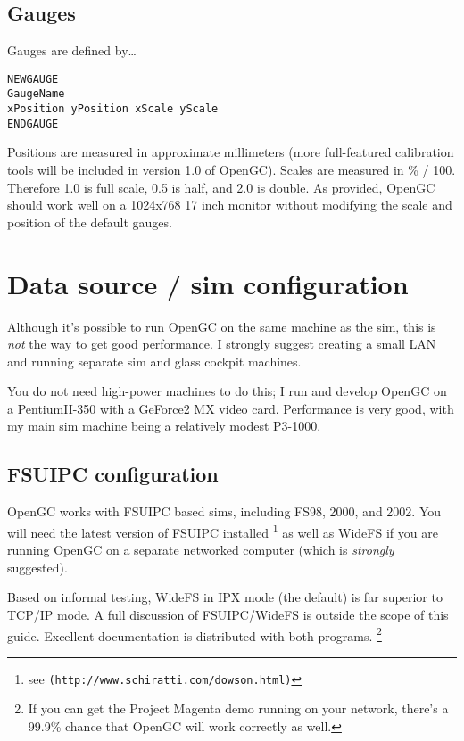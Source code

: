\documentclass[11pt]{article}
\begin{document}
\subsection{Gauges}

Gauges are defined by\dots

\begin{verbatim}
NEWGAUGE
GaugeName
xPosition yPosition xScale yScale
ENDGAUGE
\end{verbatim}

Positions are measured in approximate millimeters (more full-featured calibration tools will be included in version 1.0 of OpenGC). Scales are measured in \% / 100. Therefore 1.0 is full scale, 0.5 is half, and 2.0 is double. As provided, OpenGC should work well on a 1024x768 17 inch monitor without modifying the scale and position of the default gauges.

\section{Data source / sim configuration}

Although it's possible to run OpenGC on the same machine as the sim, this is \emph{not} the way to get good performance. I strongly suggest creating a small LAN and running separate sim and glass cockpit machines.

You do not need high-power machines to do this; I run and develop OpenGC on a PentiumII-350 with a GeForce2 MX video card. Performance is very good, with my main sim machine being a relatively modest P3-1000.

\subsection{FSUIPC configuration}

OpenGC works with FSUIPC based sims, including FS98, 2000, and 2002. You will need the latest version of FSUIPC installed \footnote{see \texttt{(http://www.schiratti.com/dowson.html)}} as well as WideFS if you are running OpenGC on a separate networked computer (which is \emph{strongly} suggested).

Based on informal testing, WideFS in IPX mode (the default) is far superior to TCP/IP mode. A full discussion of FSUIPC/WideFS is outside the scope of this guide. Excellent documentation is distributed with both programs. \footnote{If you can get the Project Magenta demo running on your network, there's a 99.9\% chance that OpenGC will work correctly as well.}
\end{document}
